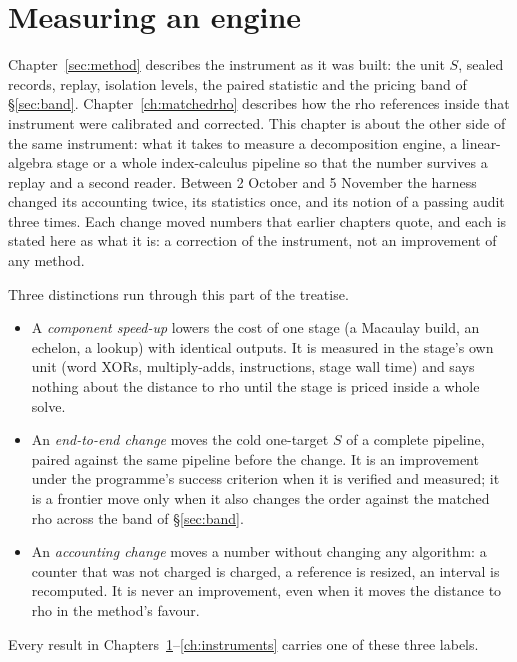 
\chapter{Measuring an engine}\label{ch:engmeasure}

Chapter~\ref{sec:method} describes the instrument as it was built: the unit
$S$, sealed records, replay, isolation levels, the paired statistic and the
pricing band of \S\ref{sec:band}. Chapter~\ref{ch:matchedrho} describes how
the rho references inside that instrument were calibrated and corrected.
This chapter is about the other side of the same instrument: what it takes
to measure a decomposition engine, a linear-algebra stage or a whole
index-calculus pipeline so that the number survives a replay and a second
reader. Between 2 October and 5 November the harness changed its
accounting twice, its statistics once, and its notion of a passing audit
three times. Each change moved numbers that earlier chapters quote, and each
is stated here as what it is: a correction of the instrument, not an
improvement of any method.

Three distinctions run through this part of the treatise.
\begin{itemize}
\item A \emph{component speed-up} lowers the cost of one stage (a Macaulay
  build, an echelon, a lookup) with identical outputs. It is measured in
  the stage's own unit (word XORs, multiply-adds, instructions, stage
  wall time) and says nothing about the distance to rho until the stage
  is priced inside a whole solve.
\item An \emph{end-to-end change} moves the cold one-target $S$ of a
  complete pipeline, paired against the same pipeline before the change.
  It is an improvement under the programme's success criterion when it is
  verified and measured; it is a frontier move only when it also changes
  the order against the matched rho across the band of \S\ref{sec:band}.
\item An \emph{accounting change} moves a number without changing any
  algorithm: a counter that was not charged is charged, a reference is
  resized, an interval is recomputed. It is never an improvement, even
  when it moves the distance to rho in the method's favour.
\end{itemize}
Every result in Chapters~\ref{ch:engmeasure}--\ref{ch:instruments} carries
one of these three labels.

